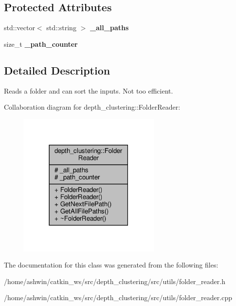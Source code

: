 \subsection*{Protected Attributes}
\begin{DoxyCompactItemize}
\item 
\mbox{\label{classdepth__clustering_1_1FolderReader_af9ed4e41e57050d7859cd066eb841792}} 
std\+::vector$<$ std\+::string $>$ {\bfseries \+\_\+all\+\_\+paths}
\item 
\mbox{\label{classdepth__clustering_1_1FolderReader_aa9fae723281ea00040a803fc15a86d5d}} 
size\+\_\+t {\bfseries \+\_\+path\+\_\+counter}
\end{DoxyCompactItemize}


\subsection{Detailed Description}
Reads a folder and can sort the inputs. Not too efficient. 

Collaboration diagram for depth\+\_\+clustering\+:\+:Folder\+Reader\+:\nopagebreak
\begin{figure}[H]
\begin{center}
\leavevmode
\includegraphics[width=201pt]{classdepth__clustering_1_1FolderReader__coll__graph}
\end{center}
\end{figure}


The documentation for this class was generated from the following files\+:\begin{DoxyCompactItemize}
\item 
/home/ashwin/catkin\+\_\+ws/src/depth\+\_\+clustering/src/utils/folder\+\_\+reader.\+h\item 
/home/ashwin/catkin\+\_\+ws/src/depth\+\_\+clustering/src/utils/folder\+\_\+reader.\+cpp\end{DoxyCompactItemize}
